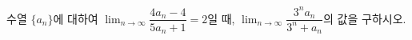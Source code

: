 수열 $\{a_n\}$에 대하여 $\displaystyle\lim_{n\to\infty}\dfrac{4a_n-4}{5a_n+1}=2$일 때, $\displaystyle\lim_{n\to\infty}\dfrac{3^na_n}{3^n+a_n}$의 값을 구하시오.
